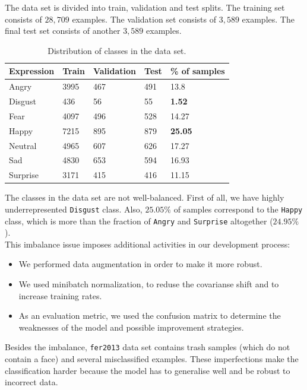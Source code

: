 The data set is divided into train, validation and test splits. The training set consists of $28,709$ examples. The validation set consists of $3,589$ examples. The final test set consists of another $3,589$ examples.\\

\begin{table}[H]
	\centering
	\begin{tabular}{ | l | l | l | l | l | }
		\hline
		Expression & Train & Validation & Test & \% of samples \\ \hline
		Angry & 3995 & 467 & 491 & 13.8 \\ %
		Disgust & 436 & 56 & 55 & \textbf{1.52} \\ %
		Fear & 4097 & 496 & 528 & 14.27 \\ %
		Happy & 7215 & 895 & 879 & \textbf{25.05} \\ %
		Neutral & 4965 & 607 & 626 & 17.27 \\ %
		Sad & 4830 & 653 & 594 & 16.93 \\ %
		Surprise & 3171 & 415 & 416 & 11.15 \\ 
		\hline
	\end{tabular}
	\caption{Distribution of classes in the data set.}
\end{table}

The classes in the data set are not well-balanced. First of all, we have highly underrepresented \texttt{Disgust} class. Also, $25.05\%$ of samples correspond to the \texttt{Happy} class, which is more than the fraction of \texttt{Angry} and \texttt{Surprise} altogether ($24.95\%$).\\ 

This imbalance issue imposes additional activities in our development process:

\begin{itemize}
    \item 
    We performed data augmentation in order to make it more robust.
    \item
    We used minibatch normalization, to reduse the covarianse shift and to increase training rates.
    \item
    As an evaluation metric, we used the confusion matrix to determine the weaknesses of the model and possible improvement strategies.
\end{itemize}

Besides the imbalance, \texttt{fer2013} data set contains trash samples (which do not contain a face) and several misclassified examples. These imperfections make the classification harder because the model has to generalise well and be robust to incorrect data. 

